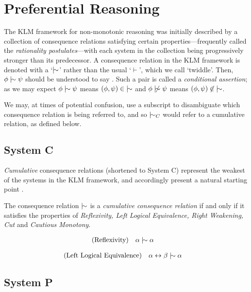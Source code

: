 \section{Preferential Reasoning}
\label{section:preferential-reasoning}
The KLM framework for non-monotonic reasoning was initially described by a collection of consequence relations satisfying certain properties---frequently called the \textit{rationality postulates}---with each system in the collection being progressively stronger than its predecessor. A consequence relation in the KLM framework is denoted with a `$\twiddle$' rather than the usual `$\vdash$', which we call `twiddle'. Then, $\phi \twiddle \psi$ should be understood to say . Such a pair is called a \textit{conditional assertion}; as we may expect $\phi \twiddle \psi$ means $(\phi,\psi) \in \; \twiddle$ and $\phi \ntwiddle \psi$ means $(\phi, \psi) \not \in \; \twiddle$.

We may, at times of potential confusion, use a subscript to disambiguate which consequence relation is being referred to, and so $\twiddle_C$ would refer to a cumulative relation, as defined below.

\subsection{System C}
\label{subsection:system-c}
\textit{Cumulative} consequence relations (shortened to System C) represent the weakest of the systems in the KLM framework, and accordingly present a natural starting point \cite{kraus1990nonmonotonic}.

\begin{definition}
\label{definition:cumulative-consequence-relation}
The consequence relation $\twiddle$ is a \emph{cumulative consequence relation} if and only if it satisfies the properties of \emph{Reflexivity, Left Logical Equivalence, Right Weakening, Cut} and \emph{Cautious Monotony}.
\end{definition}

\begin{align}
\text{(Reflexivity)} & \quad \alpha \twiddle \alpha
\end{align}


\begin{align}
\text{(Left Logical Equivalence)} & \quad \alpha \leftrightarrow \beta \twiddle \alpha
\end{align}


\subsection{System P}
\label{subsection:system-P}
